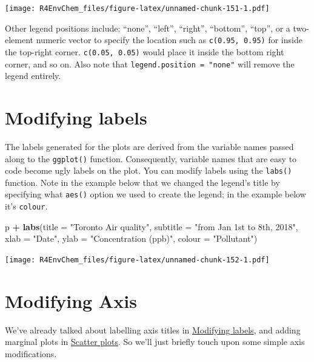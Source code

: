 \documentclass[
]{book}
\newenvironment{Shaded}{\begin{snugshade}}{\end{snugshade}}
\newcommand{\AttributeTok}[1]{\textcolor[rgb]{0.13,0.29,0.53}{#1}}
\newcommand{\FunctionTok}[1]{\textcolor[rgb]{0.13,0.29,0.53}{\textbf{#1}}}
\newcommand{\NormalTok}[1]{#1}
\newcommand{\SpecialCharTok}[1]{\textcolor[rgb]{0.81,0.36,0.00}{\textbf{#1}}}
\newcommand{\StringTok}[1]{\textcolor[rgb]{0.31,0.60,0.02}{#1}}
\begin{document}
\texttt{[image: R4EnvChem\_files/figure-latex/unnamed-chunk-151-1.pdf]}

Other legend positions include: ``none'', ``left'', ``right'', ``bottom'', ``top'', or a two-element numeric vector to specify the location such as \texttt{c(0.95,\ 0.95)} for inside the top-right corner. \texttt{c(0.05,\ 0.05)} would place it inside the bottom right corner, and so on. Also note that \texttt{legend.position\ =\ "none"} will remove the legend entirely.

\hypertarget{modifying-labels}{%
\section{Modifying labels}\label{modifying-labels}}

The labels generated for the plots are derived from the variable names passed along to the \texttt{ggplot()} function. Consequently, variable names that are easy to code become ugly labels on the plot. You can modify labels using the \texttt{labs()} function. Note in the example below that we changed the legend's title by specifying what \texttt{aes()} option we used to create the legend; in the example below it's \texttt{colour}.

\begin{Shaded}
\begin{Highlighting}[]
\NormalTok{p }\SpecialCharTok{+} \FunctionTok{labs}\NormalTok{(}\AttributeTok{title =} \StringTok{"Toronto Air quality"}\NormalTok{,}
         \AttributeTok{subtitle =} \StringTok{"from Jan 1st to 8th, 2018"}\NormalTok{, }
         \AttributeTok{xlab =} \StringTok{"Date"}\NormalTok{,}
         \AttributeTok{ylab =} \StringTok{"Concentration (ppb)"}\NormalTok{,}
         \AttributeTok{colour =} \StringTok{"Pollutant"}\NormalTok{)}
\end{Highlighting}
\end{Shaded}

\texttt{[image: R4EnvChem\_files/figure-latex/unnamed-chunk-152-1.pdf]}

\hypertarget{modifying-axis}{%
\section{Modifying Axis}\label{modifying-axis}}

We've already talked about labelling axis titles in \protect\hyperlink{modifying-labels}{Modifying labels}, and adding marginal plots in \protect\hyperlink{scatter-plots}{Scatter plots}. So we'll just briefly touch upon some simple axis modifications.
\end{document}
